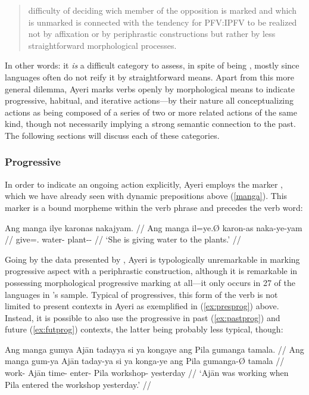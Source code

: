 \blockcquote[73]{dahl1985}{difficulty of deciding wich member of the 
opposition is marked and which is unmarked is connected with the tendency for 
PFV:IPFV to be realized not by affixation or by periphrastic constructions but 
rather by less straightforward morphological processes.}

In other words: it \emph{is} a difficult category to assess, in spite of being 
, 
mostly since languages often do not reify it by straightforward means. Apart 
from this more general dilemma, Ayeri marks verbs openly by morphological means 
to indicate progressive, habitual, and iterative actions---by their nature all 
conceptualizing actions as being composed of a series of two or more related 
actions of the same kind, though not necessarily implying a strong semantic 
connection to the past. The following sections will discuss each of these 
categories.

\subsubsection{Progressive}

In order to indicate an ongoing action explicitly, Ayeri employs the marker 
, which we have already seen with dynamic prepositions above 
(\autoref{manga}). This marker is a bound morpheme within the verb phrase and 
precedes the verb word:

\ex\label{ex:presprog}\begingl
	\gla Ang manga ilye karonas nakajyam. //
	\glb Ang manga il=ye.Ø karon-as naka-ye-yam //
	\glc \AgtT{} \Prog{} give=\TsgF{}.\Top{} water-\Parg{} 
		plant-\Pl{}-\Dat{} //
	\glft `She is giving water to the plants.' //
\endgl\xe

Going by the data presented by \citet[91]{dahl1985}, Ayeri is typologically 
unremarkable in marking progressive aspect with a periphrastic construction, 
although it is remarkable in possessing morphological progressive marking at 
all---it only occurs in 27\pct{} of the languages in \citeauthor{dahl1985}'s 
sample. Typical of progressives, this form of the verb is not limited to 
present contexts in Ayeri as exemplified in (\ref{ex:presprog}) above. Instead, 
it is possible to also use the progressive in past (\ref{ex:pastprog}) and 
future (\ref{ex:futprog}) contexts, the latter being probably less typical, 
though:

\pex\label{ex:nonpresprog}
\a\label{ex:pastprog}\begingl
	\gla Ang manga gumya {} Ajān tadayya si ya kongaye ang Pila gumanga 
		tamala. //
	\glb Ang manga gum-ya {} Ajān taday-ya si ya konga-ye ang Pila 
		gumanga-Ø tamala //
	\glc \AgtT{} \Prog{} work-\Tsg{} \Top{} Ajān time-\Loc{} \Rel{} \LocT{} 
		enter-\TsgF{} \Aarg{} Pila workshop-\Top{} yesterday //
	\glft `Ajān was working when Pila entered the workshop yesterday.' //
\endgl

